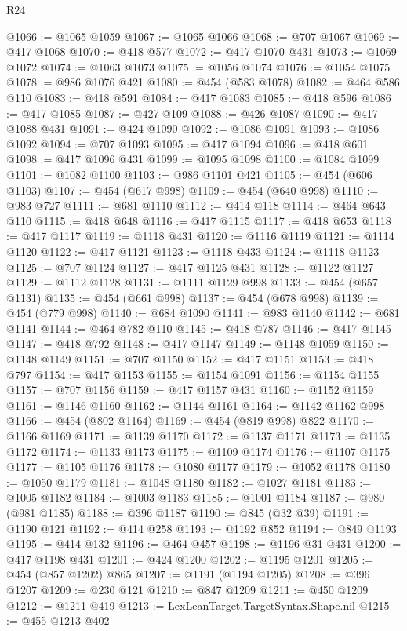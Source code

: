 \begin{lexlean}{R24}
\begin{coremodule}
@1066 := @1065 @1059
@1067 := @1065 @1066
@1068 := @707 @1067
@1069 := @417 @1068
@1070 := @418 @577
@1072 := @417 @1070 @431
@1073 := @1069 @1072
@1074 := @1063 @1073
@1075 := @1056 @1074
@1076 := @1054 @1075
@1078 := @986 @1076 @421
@1080 := @454 (@583 @1078)
@1082 := @464 @586 @110
@1083 := @418 @591
@1084 := @417 @1083
@1085 := @418 @596
@1086 := @417 @1085
@1087 := @427 @109
@1088 := @426 @1087
@1090 := @417 @1088 @431
@1091 := @424 @1090
@1092 := @1086 @1091
@1093 := @1086 @1092
@1094 := @707 @1093
@1095 := @417 @1094
@1096 := @418 @601
@1098 := @417 @1096 @431
@1099 := @1095 @1098
@1100 := @1084 @1099
@1101 := @1082 @1100
@1103 := @986 @1101 @421
@1105 := @454 (@606 @1103)
@1107 := @454 (@617 @998)
@1109 := @454 (@640 @998)
@1110 := @983 @727
@1111 := @681 @1110
@1112 := @414 @118
@1114 := @464 @643 @110
@1115 := @418 @648
@1116 := @417 @1115
@1117 := @418 @653
@1118 := @417 @1117
@1119 := @1118 @431
@1120 := @1116 @1119
@1121 := @1114 @1120
@1122 := @417 @1121
@1123 := @1118 @433
@1124 := @1118 @1123
@1125 := @707 @1124
@1127 := @417 @1125 @431
@1128 := @1122 @1127
@1129 := @1112 @1128
@1131 := @1111 @1129 @998
@1133 := @454 (@657 @1131)
@1135 := @454 (@661 @998)
@1137 := @454 (@678 @998)
@1139 := @454 (@779 @998)
@1140 := @684 @1090
@1141 := @983 @1140
@1142 := @681 @1141
@1144 := @464 @782 @110
@1145 := @418 @787
@1146 := @417 @1145
@1147 := @418 @792
@1148 := @417 @1147
@1149 := @1148 @1059
@1150 := @1148 @1149
@1151 := @707 @1150
@1152 := @417 @1151
@1153 := @418 @797
@1154 := @417 @1153
@1155 := @1154 @1091
@1156 := @1154 @1155
@1157 := @707 @1156
@1159 := @417 @1157 @431
@1160 := @1152 @1159
@1161 := @1146 @1160
@1162 := @1144 @1161
@1164 := @1142 @1162 @998
@1166 := @454 (@802 @1164)
@1169 := @454 (@819 @998) @822
@1170 := @1166 @1169
@1171 := @1139 @1170
@1172 := @1137 @1171
@1173 := @1135 @1172
@1174 := @1133 @1173
@1175 := @1109 @1174
@1176 := @1107 @1175
@1177 := @1105 @1176
@1178 := @1080 @1177
@1179 := @1052 @1178
@1180 := @1050 @1179
@1181 := @1048 @1180
@1182 := @1027 @1181
@1183 := @1005 @1182
@1184 := @1003 @1183
@1185 := @1001 @1184
@1187 := @980 (@981 @1185)
@1188 := @396 @1187
@1190 := @845 (@32 @39)
@1191 := @1190 @121
@1192 := @414 @258
@1193 := @1192 @852
@1194 := @849 @1193
@1195 := @414 @132
@1196 := @464 @457
@1198 := @1196 @31 @431
@1200 := @417 @1198 @431
@1201 := @424 @1200
@1202 := @1195 @1201
@1205 := @454 (@857 @1202) @865
@1207 := @1191 (@1194 @1205)
@1208 := @396 @1207
@1209 := @230 @121
@1210 := @847 @1209
@1211 := @450 @1209
@1212 := @1211 @419
@1213 := LexLeanTarget.TargetSyntax.Shape.nil
@1215 := @455 @1213 @402

\end{coremodule}
\end{lexlean}
